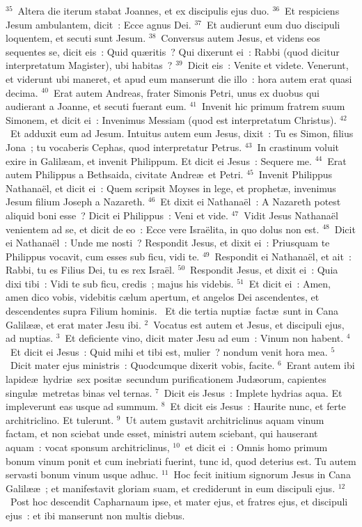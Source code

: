 ${}^{35}$~Altera die iterum stabat Joannes, et ex discipulis ejus duo.
${}^{36}$~Et respiciens Jesum ambulantem, dicit~: Ecce agnus Dei.
${}^{37}$~Et audierunt eum duo discipuli loquentem, et secuti sunt Jesum.
${}^{38}$~Conversus autem Jesus, et videns eos sequentes se, dicit eis~: Quid qu\ae ritis~? Qui dixerunt ei~: Rabbi (quod dicitur interpretatum Magister), ubi habitas~?
${}^{39}$~Dicit eis~: Venite et videte. Venerunt, et viderunt ubi maneret, et apud eum manserunt die illo~: hora autem erat quasi decima.
${}^{40}$~Erat autem Andreas, frater Simonis Petri, unus ex duobus qui audierant a Joanne, et secuti fuerant eum.
${}^{41}$~Invenit hic primum fratrem suum Simonem, et dicit ei~: Invenimus Messiam (quod est interpretatum Christus).
${}^{42}$~Et adduxit eum ad Jesum. Intuitus autem eum Jesus, dixit~: Tu es Simon, filius Jona~; tu vocaberis Cephas, quod interpretatur Petrus.
${}^{43}$~In crastinum voluit exire in Galil\ae am, et invenit Philippum. Et dicit ei Jesus~: Sequere me.
${}^{44}$~Erat autem Philippus a Bethsaida, civitate Andre\ae\ et Petri.
${}^{45}$~Invenit Philippus Nathana\"el, et dicit ei~: Quem scripsit Moyses in lege, et prophet\ae , invenimus Jesum filium Joseph a Nazareth.
${}^{46}$~Et dixit ei Nathana\"el~: A Nazareth potest aliquid boni esse~? Dicit ei Philippus~: Veni et vide.
${}^{47}$~Vidit Jesus Nathana\"el venientem ad se, et dicit de eo~: Ecce vere Isra\"elita, in quo dolus non est.
${}^{48}$~Dicit ei Nathana\"el~: Unde me nosti~? Respondit Jesus, et dixit ei~: Priusquam te Philippus vocavit, cum esses sub ficu, vidi te.
${}^{49}$~Respondit ei Nathana\"el, et ait~: Rabbi, tu es Filius Dei, tu es rex Isra\"el.
${}^{50}$~Respondit Jesus, et dixit ei~: Quia dixi tibi~: Vidi te sub ficu, credis~; majus his videbis.
${}^{51}$~Et dicit ei~: Amen, amen dico vobis, videbitis c\ae lum apertum, et angelos Dei ascendentes, et descendentes supra Filium hominis.
~\lettrine[lines=10,image=true,loversize=0.05,lraise=-0.03]{E}{}t die tertia nupti\ae\ fact\ae\ sunt in Cana Galil\ae \ae , et erat mater Jesu ibi.
${}^{2}$~Vocatus est autem et Jesus, et discipuli ejus, ad nuptias.
${}^{3}$~Et deficiente vino, dicit mater Jesu ad eum~: Vinum non habent.
${}^{4}$~Et dicit ei Jesus~: Quid mihi et tibi est, mulier~? nondum venit hora mea.
${}^{5}$~Dicit mater ejus ministris~: Quodcumque dixerit vobis, facite.
${}^{6}$~Erant autem ibi lapide\ae\ hydri\ae\ sex posit\ae\ secundum purificationem Jud\ae orum, capientes singul\ae\ metretas binas vel ternas.
${}^{7}$~Dicit eis Jesus~: Implete hydrias aqua. Et impleverunt eas usque ad summum.
${}^{8}$~Et dicit eis Jesus~: Haurite nunc, et ferte architriclino. Et tulerunt.
${}^{9}$~Ut autem gustavit architriclinus aquam vinum factam, et non sciebat unde esset, ministri autem sciebant, qui hauserant aquam~: vocat sponsum architriclinus,
${}^{10}$~et dicit ei~: Omnis homo primum bonum vinum ponit et cum inebriati fuerint, tunc id, quod deterius est. Tu autem servasti bonum vinum usque adhuc.
${}^{11}$~Hoc fecit initium signorum Jesus in Cana Galil\ae \ae~; et manifestavit gloriam suam, et crediderunt in eum discipuli ejus.
${}^{12}$~Post hoc descendit Capharnaum ipse, et mater ejus, et fratres ejus, et discipuli ejus~: et ibi manserunt non multis diebus.


